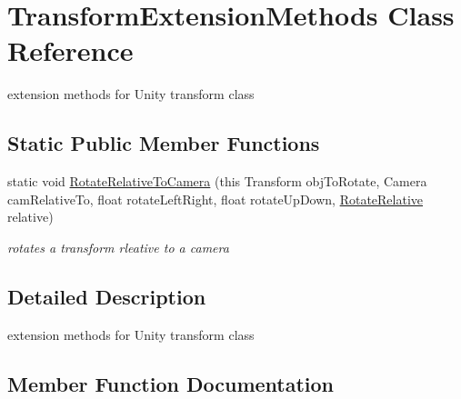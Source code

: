 \hypertarget{class_transform_extension_methods}{}\section{Transform\+Extension\+Methods Class Reference}
\label{class_transform_extension_methods}


extension methods for Unity transform class  


\subsection*{Static Public Member Functions}
\begin{DoxyCompactItemize}
\item 
static void \mbox{\hyperlink{class_transform_extension_methods_ad6c9459ef6c2fd963fb1145f11c839a3}{Rotate\+Relative\+To\+Camera}} (this Transform obj\+To\+Rotate, Camera cam\+Relative\+To, float rotate\+Left\+Right, float rotate\+Up\+Down, \mbox{\hyperlink{_transform_extension_methods_8cs_a6652dfee9c8aeffcd5b5858801e16ca4}{Rotate\+Relative}} relative)
\begin{DoxyCompactList}\small\item\em rotates a transform rleative to a camera \end{DoxyCompactList}\end{DoxyCompactItemize}


\subsection{Detailed Description}
extension methods for Unity transform class 



\subsection{Member Function Documentation}
\mbox{\label{class_transform_extension_methods_ad6c9459ef6c2fd963fb1145f11c839a3}} 
